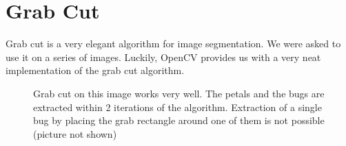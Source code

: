 \documentclass[11pt,a4paper]{article}
\begin{document}
\section{Grab Cut}
Grab cut is a very elegant algorithm for image segmentation. We were asked to use it on a series of images. Luckily, OpenCV provides us with a very neat implementation of the grab cut algorithm.
\begin{figure}
\centering
{}
\quad
{}

\caption{Grab cut on this image works very well. The petals and the bugs are extracted within 2 iterations of the algorithm. Extraction of a single bug by placing the grab rectangle around one of them is not possible (picture not shown)}%

\end{figure}
\end{document}
